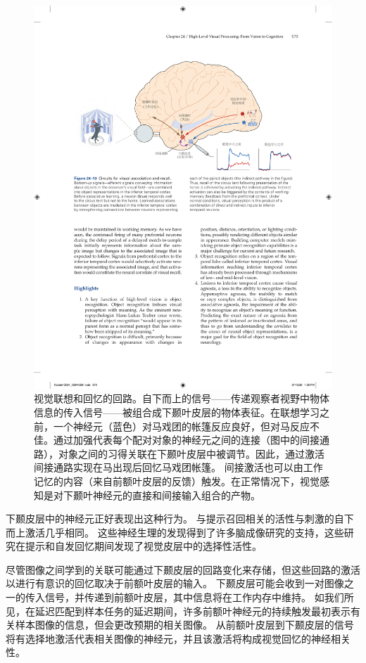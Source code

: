 \begin{figure}[htbp]
	\centering
	\includegraphics[width=0.9\linewidth]{chap24/fig_24_13}
	\caption{视觉联想和回忆的回路。自下而上的信号——传递观察者视野中物体信息的传入信号——被组合成下颞叶皮层的物体表征。在联想学习之前，一个神经元（蓝色）对马戏团的帐篷反应良好，但对马反应不佳。通过加强代表每个配对对象的神经元之间的连接（图中的间接通路），对象之间的习得关联在下颞叶皮层中被调节。因此，通过激活间接通路实现在马出现后回忆马戏团帐篷。 间接激活也可以由工作记忆的内容（来自前额叶皮层的反馈）触发。在正常情况下，视觉感知是对下颞叶神经元的直接和间接输入组合的产物。}
	\label{fig:24_13}
\end{figure}


下颞皮层中的神经元正好表现出这种行为。
与提示召回相关的活性与刺激的自下而上激活几乎相同。 
这些神经生理的发现得到了许多脑成像研究的支持，这些研究在提示和自发回忆期间发现了视觉皮层中的选择性活性。


尽管图像之间学到的关联可能通过下颞皮层的回路变化来存储，但这些回路的激活以进行有意识的回忆取决于前额叶皮层的输入。
下颞皮层可能会收到一对图像之一的传入信号，并传递到前额叶皮层，其中信息将在工作内存中维持。
如我们所见，在延迟匹配到样本任务的延迟期间，许多前额叶神经元的持续触发最初表示有关样本图像的信息，但会更改预期的相关图像。
从前额叶皮层到下颞皮层的信号将有选择地激活代表相关图像的神经元，并且该激活将构成视觉回忆的神经相关性。



